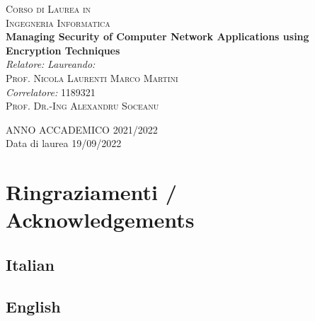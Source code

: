 \begin{titlepage}
\begin{center}
\vspace{0.4cm}
\textsc{\large Corso di Laurea in}\\
\textsc{\large Ingegneria Informatica}\\
\vfill
{ \LARGE \bfseries Managing Security of Computer Network Applications using Encryption Techniques
}\\
\vfill
\textit{\large Relatore:} \hfill \textit{\large Laureando:}\\
\textsc{\large Prof. Nicola Laurenti} \hfill \textsc{\large Marco Martini}\\
\textit{\large Correlatore:} \hfill \textsc{\large 1189321}\\
\textsc{\large Prof. Dr.-Ing Alexandru Soceanu} \hfill \textsc{}

\vfill
{\large ANNO ACCADEMICO 2021/2022} \\
{\large Data di laurea 19/09/2022}
\end{center}
\end{titlepage}

\thispagestyle{empty} %




\cleardoublepage

\section*{Ringraziamenti / Acknowledgements}

\subsection*{Italian}



%
%
%
%
\subsection*{English}
%
%
%


